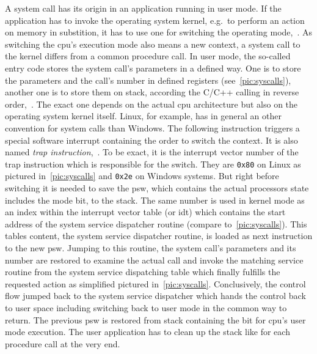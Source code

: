 A system call has its origin in an application running in user mode.
If the application has to invoke the operating system kernel, e.g.\ to perform an action on memory in substition, it has to use one for switching the operating mode\cite{glatz2015betriebssysteme},~\cite{tanenbaum-modern-operating-systems}.
As switching the \ac{cpu}'s execution mode also means a new context, a system call to the kernel differs from a common procedure call.
In user mode, the so-called entry code stores the system call's parameters in a defined way.
One is to store the parameters and the call's number in defined registers (see~\ref{pic:syscalls}), another one is to store them on stack, according the C/C++ calling in reverse order\cite{silberschatz2009operating},~\cite{glatz2015betriebssysteme}.
The exact one depends on the actual \ac{cpu} architecture but also on the operating system kernel itself.
Linux, for example, has in general an other convention for system calls than Windows. 
The following instruction triggers a special software interrupt containing the order to switch the context.
It is also named \textit{trap instruction}\cite{glatz2015betriebssysteme},~\cite{tanenbaum-modern-operating-systems}.
To be exact, it is the interrupt vector number of the trap instruction which is responsible for the switch.
They are \texttt{0x80} on Linux as pictured in~\ref{pic:syscalls} and \texttt{0x2e} on Windows systems\cite{glatz2015betriebssysteme}.
But right before switching it is needed to save the \acf{psw}, which contains the actual processors state includes the mode bit, to the stack.
The same number is used in kernel mode as an index within the interrupt vector table (or \acf{idt}) which contains the start address of the system service dispatcher routine (compare to~\ref{pic:syscalls}).
This tables content, the system service dispatcher routine, is loaded as next instruction to the new \ac{psw}\cite{brause2017betriebssysteme}.
Jumping to this routine, the system call's parameters and its number are restored to examine the actual call and invoke the matching service routine from the system service dispatching table which finally fulfills the requested action as simplified pictured in~\ref{pic:syscalls}\cite{glatz2015betriebssysteme}.
Conclusively, the control flow jumped back to the system service dispatcher which hands the control back to user space including switching back to user mode in the common way to return\cite{glatz2015betriebssysteme}.
The previous \ac{psw} is restored from stack containing the bit for \ac{cpu}'s user mode execution.
The user application has to clean up the stack like for each procedure call at the very end\cite{tanenbaum-modern-operating-systems}.

